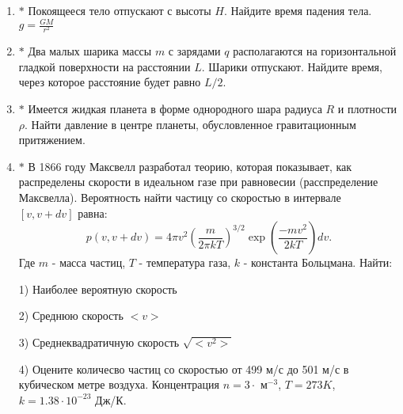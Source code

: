 \begin{enumerate}
\begin{enumerate}
\begin{minipage}{0.5\textwidth}
    \end{minipage}
    \end{enumerate}
    \item $\boldsymbol{*}$ Покоящееся тело отпускают с высоты $H$. Найдите время падения тела. $\displaystyle g = \frac{GM}{r^2}$
    \item $\boldsymbol{*}$ Два малых шарика  массы $m$ с зарядами $q$ располагаются на горизонтальной гладкой поверхности на расстоянии $L$. Шарики отпускают. Найдите время, через которое расстояние будет равно $L/2$.
    \item $\boldsymbol{*}$ Имеется жидкая планета в форме однородного шара радиуса $R$ и плотности $\rho$. Найти давление в центре планеты, обусловленное гравитационным притяжением.
    \item $\boldsymbol{*}$ В 1866 году Максвелл разработал теорию, которая показывает, как распределены скорости в идеальном газе при равновесии (расспределение Максвелла). Вероятность найти частицу со скоростью в интервале $[v, v+dv]$ равна:
    \[
    p(v, v+dv) = 4\pi v^2 \left( \frac{m}{2\pi kT} \right)^{3/2} \exp \left( \frac{-mv^2}{2kT} \right) dv.
    \]
    Где $m$ - масса частиц, $T$ - температура газа, $k$ - константа Больцмана. Найти:

        1) Наиболее вероятную скорость
        
        2) Среднюю скорость $<v>$      
        
        3) Среднеквадратичную скорость  $\sqrt{<v^2>}$ 
        
        4) Оцените количесво частиц со скоростью от 499 м/с до 501 м/с в кубическом метре воздуха. Концентрация $n = 3 \cdot$ м$^{-3}$, $T = 273K$, $k = 1.38\cdot 10^{-23}$ Дж/К. 
\end{enumerate}